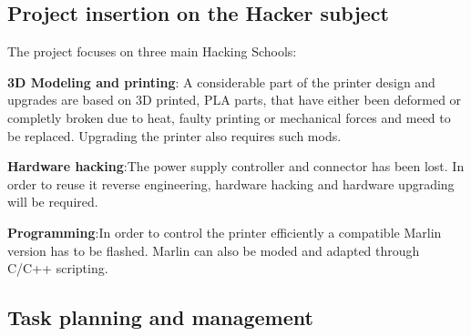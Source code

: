 \documentclass[a4paper,12pt]{article}
\begin{document}
		\subsection{Project insertion on the Hacker subject}
		The project focuses on three main Hacking Schools: \par
		\textbf{3D Modeling and printing}: A considerable part of the printer design and upgrades are based on 3D printed, PLA parts, that have either been deformed or completly broken due to heat, faulty printing or mechanical forces and meed to be replaced. Upgrading the printer also requires such mods. \par
		\textbf{Hardware hacking}:The power supply controller and connector has been lost. In order to reuse it reverse engineering, hardware hacking and hardware upgrading will be required. \par
		\textbf{Programming}:In order to control the printer efficiently a compatible Marlin version has to be flashed. Marlin can also be moded and adapted through C/C++ scripting.\par
		

		\subsection{Task planning and management}
\end{document}
